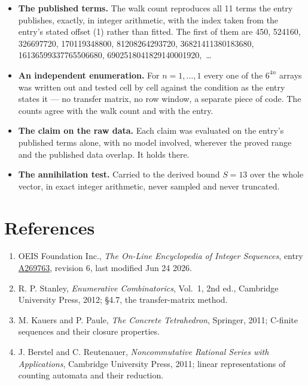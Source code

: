 \documentclass[11pt]{article}
\theoremstyle{definition}
\begin{document}
\begin{itemize}

\item {\bfseries The published terms.} The walk count reproduces all 11 terms the entry publishes, exactly, in integer arithmetic, with the index taken from the entry's stated offset (1) rather than fitted. The first of them are 450, 524160, 326697720, 170119348800, 81208264293720, 36821411380183680, 16136599337765506680, 6902518041829140001920,~\dots

\item {\bfseries An independent enumeration.} For $n = 1,\dots,1$ every one of the $6^{4n}$ arrays was written out and tested cell by cell against the condition as the entry states it --- no transfer matrix, no row window, a separate piece of code. The counts agree with the walk count and with the entry.

\item {\bfseries The claim on the raw data.} Each claim was evaluated on the entry's published terms alone, with no model involved, wherever the proved range and the published data overlap. It holds there.

\item {\bfseries The annihilation test.} Carried to the derived bound $S = 13$ over the whole vector, in exact integer arithmetic, never sampled and never truncated.

\end{itemize}

\section{References}

\begin{enumerate}

\item OEIS Foundation Inc., \emph{The On-Line Encyclopedia of Integer Sequences}, entry \href{https://oeis.org/A269763}{A269763}, revision 6, last modified Jun 24 2026.

\item R. P. Stanley, \emph{Enumerative Combinatorics}, Vol.~1, 2nd ed., Cambridge University Press, 2012; \S4.7, the transfer-matrix method.

\item M. Kauers and P. Paule, \emph{The Concrete Tetrahedron}, Springer, 2011; C-finite sequences and their closure properties.

\item J. Berstel and C. Reutenauer, \emph{Noncommutative Rational Series with Applications}, Cambridge University Press, 2011; linear representations of counting automata and their reduction.

\end{enumerate}
\end{document}
